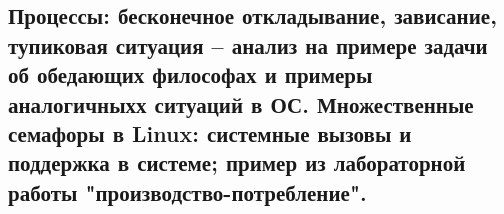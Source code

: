 \newpage

\subsection{Процессы: бесконечное откладывание, зависание, тупиковая ситуация – анализ на примере задачи об обедающих философах и примеры аналогичныхх ситуаций в ОС. Множественные семафоры в Linux: системные вызовы и поддержка в системе; пример из лабораторной работы "производство-потребление".}
